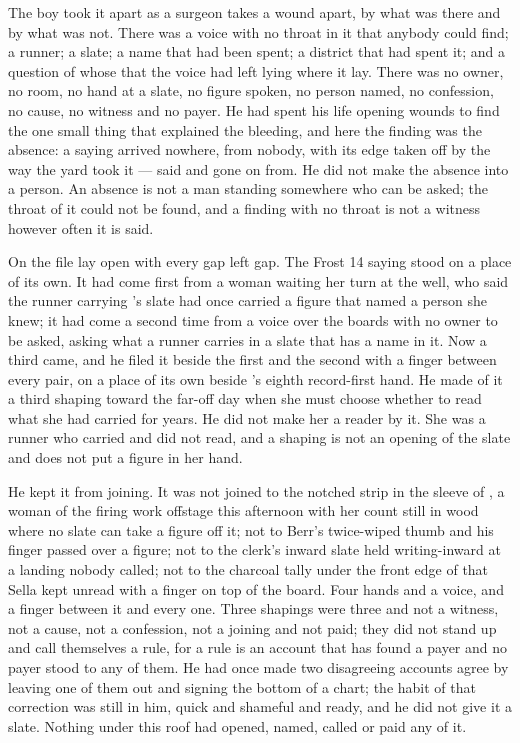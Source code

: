 The boy took it apart as a surgeon takes a wound apart, by what was there and by what was not. There was a voice with no throat in it that anybody could find; a runner; a slate; a name that had been spent; a district that had spent it; and a question of whose that the voice had left lying where it lay. There was no owner, no room, no hand at a slate, no figure spoken, no person named, no confession, no cause, no witness and no payer. He had spent his life opening wounds to find the one small thing that explained the bleeding, and here the finding was the absence: a saying arrived nowhere, from nobody, with its edge taken off by the way the yard took it --- said and gone on from. He did not make the absence into a person. An absence is not a man standing somewhere who can be asked; the throat of it could not be found, and a finding with no throat is not a witness however often it is said.

On  the file lay open with every gap left gap. The Frost 14 saying stood on a place of its own. It had come first from a woman waiting her turn at the well, who said the runner carrying 's slate had once carried a figure that named a person she knew; it had come a second time from a voice over the boards with no owner to be asked, asking what a runner carries in a slate that has a name in it. Now a third came, and he filed it beside the first and the second with a finger between every pair, on a place of its own beside 's eighth record-first hand. He made of it a third shaping toward the far-off day when she must choose whether to read what she had carried for years. He did not make her a reader by it. She was a runner who carried and did not read, and a shaping is not an opening of the slate and does not put a figure in her hand.

He kept it from joining. It was not joined to the notched strip in the sleeve of , a woman of the firing work offstage this afternoon with her count still in wood where no slate can take a figure off it; not to Berr's twice-wiped thumb and his finger passed over a figure; not to the clerk's inward slate held writing-inward at a landing nobody called; not to the charcoal tally under the front edge of  that Sella kept unread with a finger on top of the board. Four hands and a voice, and a finger between it and every one. Three shapings were three and not a witness, not a cause, not a confession, not a joining and not paid; they did not stand up and call themselves a rule, for a rule is an account that has found a payer and no payer stood to any of them. He had once made two disagreeing accounts agree by leaving one of them out and signing the bottom of a chart; the habit of that correction was still in him, quick and shameful and ready, and he did not give it a slate. Nothing under this roof had opened, named, called or paid any of it.

